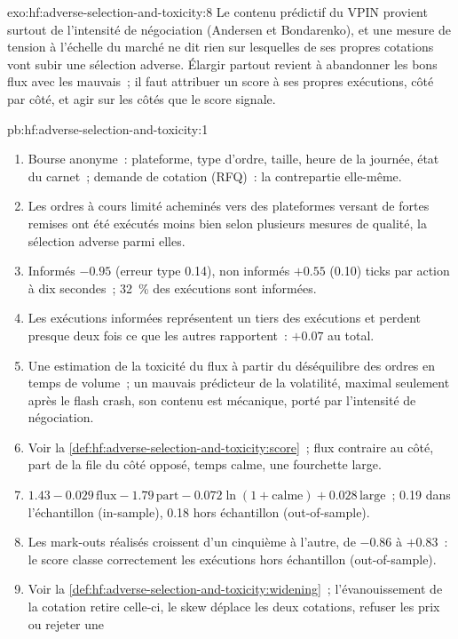 \begin{solution}{exo:hf:adverse-selection-and-toxicity:8}
Le contenu prédictif du VPIN provient surtout de l'intensité de négociation (Andersen et Bondarenko), et une mesure de tension à l'échelle du marché ne dit rien sur
lesquelles de ses propres cotations vont subir une sélection adverse. Élargir partout revient à abandonner les bons flux avec les mauvais~; il faut attribuer un score à ses propres exécutions, côté par côté, et agir sur les
côtés que le score signale.
\end{solution}

\begin{solution}{pb:hf:adverse-selection-and-toxicity:1}
\begin{enumerate}
\item Bourse anonyme~: plateforme, type d'ordre, taille, heure de la journée, état du carnet~; demande de cotation (RFQ)~: la contrepartie elle-même.
\item Les ordres à cours limité acheminés vers des plateformes versant de fortes remises ont été exécutés moins bien selon plusieurs mesures de qualité, la sélection adverse parmi elles.
\item Informés $-0.95$ (erreur type 0.14), non informés $+0.55$ (0.10) ticks par action à dix secondes~; 32~\% des exécutions sont informées.
\item Les exécutions informées représentent un tiers des exécutions et perdent presque deux fois ce que les autres rapportent~: $+0.07$ au total.
\item Une estimation de la toxicité du flux à partir du déséquilibre des ordres en temps de volume~; un mauvais prédicteur de la volatilité, maximal seulement après le flash crash, son contenu
est mécanique, porté par l'intensité de négociation.
\item Voir la \cref{def:hf:adverse-selection-and-toxicity:score}~; flux contraire au côté, part de la file du côté opposé, temps calme, une fourchette large.
\item $1.43-0.029\,\text{flux}-1.79\,\text{part}-0.072\ln(1+\text{calme})+0.028\,\text{large}$~; 0.19 dans l'échantillon (in-sample), 0.18 hors échantillon (out-of-sample).
\item Les mark-outs réalisés croissent d'un cinquième à l'autre, de $-0.86$ à $+0.83$~: le score classe correctement les exécutions hors échantillon (out-of-sample).
\item Voir la \cref{def:hf:adverse-selection-and-toxicity:widening}~; l'évanouissement de la cotation retire celle-ci, le skew déplace les deux cotations, refuser les prix ou rejeter une

\end{enumerate}
\end{solution}
